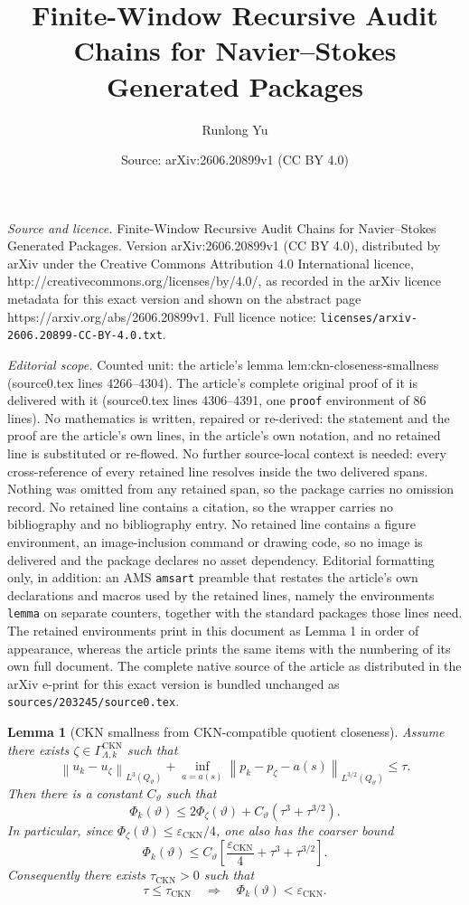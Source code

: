 \documentclass[10pt,a4paper]{amsart}
\title{Finite-Window Recursive Audit Chains for Navier--Stokes Generated Packages}
\author{Runlong Yu}
\date{Source: arXiv:2606.20899v1 (CC BY 4.0)}
\newtheorem{lemma}{Lemma}
\newcommand{\norm}[1]{\left\lVert #1\right\rVert}
\begin{document}
\maketitle

\noindent\emph{Source and licence.} Finite-Window Recursive Audit Chains for Navier--Stokes Generated Packages. Version arXiv:2606.20899v1 (CC BY 4.0), distributed by arXiv under the Creative Commons Attribution 4.0 International licence, http://creativecommons.org/licenses/by/4.0/, as recorded in the arXiv licence metadata for this exact version and shown on the abstract page https://arxiv.org/abs/2606.20899v1. Full licence notice: \texttt{licenses/arxiv-2606.20899-CC-BY-4.0.txt}.\par\smallskip

\noindent\textit{Editorial scope.} Counted unit: the article's lemma lem:ckn-closeness-smallness (source0.tex lines 4266--4304). The article's complete original proof of it is delivered with it (source0.tex lines 4306--4391, one \texttt{proof} environment of 86 lines). No mathematics is written, repaired or re-derived: the statement and the proof are the article's own lines, in the article's own notation, and no retained line is substituted or re-flowed.  No further source-local context is needed: every cross-reference of every retained line resolves inside the two delivered spans.  Nothing was omitted from any retained span, so the package carries no omission record.  No retained line contains a citation, so the wrapper carries no bibliography and no bibliography entry.  No retained line contains a figure environment, an image-inclusion command or drawing code, so no image is delivered and the package declares no asset dependency.  Editorial formatting only, in addition: an AMS \texttt{amsart} preamble that restates the article's own declarations and macros used by the retained lines, namely the environments \texttt{lemma} on separate counters, together with the standard packages those lines need.  The retained environments print in this document as Lemma 1 in order of appearance, whereas the article prints the same items with the numbering of its own full document.  The complete native source of the article as distributed in the arXiv e-print for this exact version is bundled unchanged as \texttt{sources/203245/source0.tex}.
\begin{lemma}[CKN smallness from CKN-compatible quotient closeness]
\label{lem:ckn-closeness-smallness}
Assume there exists \(\zeta\in\Gamma_{\Lambda,k}^{\mathrm{CKN}}\) such that
\[
  \norm{u_k-u_\zeta}_{L^3(Q_\vartheta)}
  +
  \inf_{a=a(s)}
  \norm{p_k-p_\zeta-a(s)}_{L^{3/2}(Q_\vartheta)}
  \le
  \tau.
\]
Then there is a constant \(C_\vartheta\) such that
\[
  \Phi_k(\vartheta)
  \le
  2\Phi_\zeta(\vartheta)
  +
  C_\vartheta(\tau^3+\tau^{3/2}).
\]
In particular, since
\(\Phi_\zeta(\vartheta)\le\varepsilon_{\mathrm{CKN}}/4\), one also has the
coarser bound
\[
  \Phi_k(\vartheta)
  \le
  C_\vartheta
  \left[
  \frac{\varepsilon_{\mathrm{CKN}}}{4}
  +
  \tau^3+\tau^{3/2}
  \right].
\]
Consequently there exists \(\tau_{\mathrm{CKN}}>0\) such that
\[
  \tau\le\tau_{\mathrm{CKN}}
  \quad\Longrightarrow\quad
  \Phi_k(\vartheta)<\varepsilon_{\mathrm{CKN}}.
\]
\end{lemma}
\end{document}
